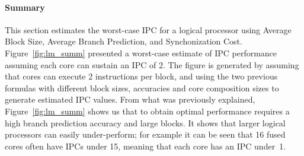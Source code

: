 \paragraph{Summary}

This section estimates the worst-case IPC for a logical processor using Average Block Size, Average Branch Prediction, and Synchonization Cost.
Figure~\ref{fig:lm_summ} presented a worst-case estimate of IPC performance assuming each core can sustain an IPC of 2.
The figure is generated by assuming that cores can execute 2 instructions per block, and using the two previous formulas with different block sizes, accuracies and core composition sizes to generate estimated IPC values.
From what was previously explained, Figure~\ref{fig:lm_summ} shows us that to obtain optimal performance requires a high branch prediction accuracy and large blocks.
It shows that larger logical processors can easily under-perform; for example it can be seen that 16 fused cores often have IPCs under 15, meaning that each core has an IPC under~1.

